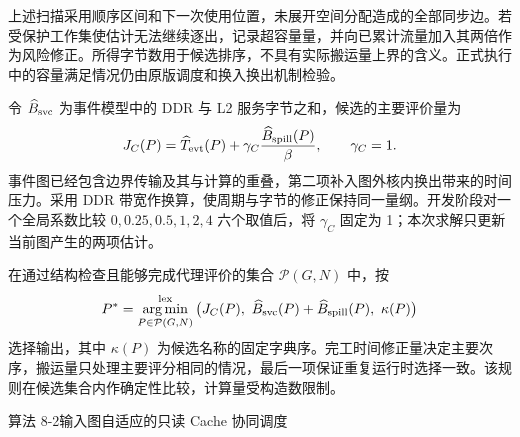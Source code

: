 上述扫描采用顺序区间和下一次使用位置，未展开空间分配造成的全部同步边。若受保护工作集使估计无法继续逐出，记录超容量量，并向已累计流量加入其两倍作为风险修正。所得字节数用于候选排序，不具有实际搬运量上界的含义。正式执行中的容量满足情况仍由原版调度和换入换出机制检验。

令 $\widehat B_{\rm svc}$ 为事件模型中的 DDR 与 L2 服务字节之和，候选的主要评价量为
\begin{equation}
J_C(P)=\widehat T_{\rm evt}(P)+\gamma_C\frac{\widehat B_{\rm spill}(P)}{\beta},
\qquad \gamma_C=1.
\label{eq:q3-score}
\end{equation}
事件图已经包含边界传输及其与计算的重叠，第二项补入图外核内换出带来的时间压力。采用 DDR 带宽作换算，使周期与字节的修正保持同一量纲。开发阶段对一个全局系数比较 $0,0.25,0.5,1,2,4$ 六个取值后，将 $\gamma_C$ 固定为 1；本次求解只更新当前图产生的两项估计。

在通过结构检查且能够完成代理评价的集合 $\mathcal P(G,N)$ 中，按
\begin{equation}
P^*=\operatorname*{arg\,min}_{P\in\mathcal P(G,N)}^{\rm lex}
\big(J_C(P),\ \widehat B_{\rm svc}(P)+\widehat B_{\rm spill}(P),\ \kappa(P)\big)
\label{eq:q3-selection}
\end{equation}
选择输出，其中 $\kappa(P)$ 为候选名称的固定字典序。完工时间修正量决定主要次序，搬运量只处理主要评分相同的情况，最后一项保证重复运行时选择一致。该规则在候选集合内作确定性比较，计算量受构造数限制。

\begin{algorithmblock}{算法 8-2\quad 输入图自适应的只读 Cache 协同调度}
\end{algorithmblock}

